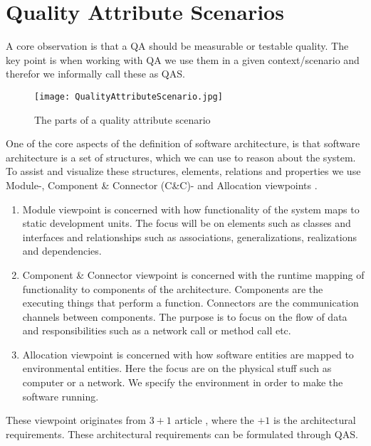 \section{Quality Attribute Scenarios}

A core observation is that a QA should be measurable or testable quality. The key point is when working with QA we use them in a given context/scenario and therefor we informally call these as QAS.\\



\begin{figure}[H]
\centering
\texttt{[image: QualityAttributeScenario.jpg]}

\caption{The parts of a quality attribute scenario}
\label{fig:Quality_Attribute_Scenario}
\end{figure}






One of the core aspects of the definition of software architecture, is that software architecture is a set of structures, which we can use to reason about the system. To assist and visualize these structures, elements, relations and properties we use Module-, Component \& Connector (C\&C)- and Allocation viewpoints \cite{3+1}. 

\begin{enumerate}
    \item Module viewpoint is concerned with how functionality of the system maps to static development units. The focus will be on elements such as classes and interfaces and relationships such as associations, generalizations, realizations and dependencies.
    \item Component \& Connector viewpoint is concerned with the runtime mapping of functionality to components of the architecture. Components are the executing things that perform a function. Connectors are the communication channels between components. The purpose is to focus on the flow of data and responsibilities such as a network call or method call etc.
    \item Allocation viewpoint is concerned with how software entities are mapped to environmental entities. Here the focus are on the physical stuff such as computer or a network. We specify the environment in order to make the software running. 
\end{enumerate}


These viewpoint originates from $3+1$ article \cite{3+1}, where the $+1$ is the architectural requirements. These architectural requirements can be formulated through QAS.


